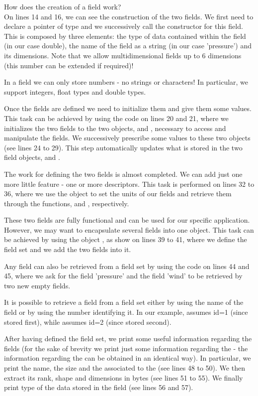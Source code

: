 How does the creation of a field work?\\
On lines 14 and 16, we can see the construction of the two fields.
We first need to declare a pointer of type  and we 
successively call the constructor for this field. This is composed 
by three elements: the type of data contained within the field 
(in our case double), the name of the field as a string (in our 
case 'pressure') and its dimensions.
Note that we allow multidimensional fields up to 6 dimensions 
(this number can be extended if required)!
%
\begin{tipbox}
In a field we can only store numbers - no strings or characters!
In particular, we support integers, float types and double types.
\end{tipbox}
%
Once the fields are defined we need to initialize them 
and give them some values. This task can be achieved 
by using the code on lines 20 and 21, where we initializes 
the two fields to the two  objects, 
and , necessary to access and manipulate the fields. 
We successively prescribe some values to these two objects 
(see lines 24 to 29). This step automatically updates what 
is stored in the two field objects,  
and .

The work for defining the two fields is almost completed.
We can add just one more little feature - one or more 
descriptors. This task is performed on lines 32 to 36, 
where we use the  object to set the 
units of our fields and retrieve them through the 
functions,  and , respectively.

These two fields are fully functional and can be used 
for our specific application. However, we may want to 
encapsulate several fields into one object. This task 
can be achieved by using the object , 
as show on lines 39 to 41, where we define the field 
set and we add the two fields into it.

Any field can also be retrieved from a field set by 
using the code on lines 44 and 45, where we ask for 
the field 'pressure' and the field 'wind' to be retrieved
by two new empty fields.
%
\begin{notebox}
It is possible to retrieve a field from a field set 
either by using the name of the field or by using 
the number identifying it. In our example,  
assumes id=1 (since stored first), while 
assumes id=2 (since stored second).
\end{notebox}
%
After having defined the field set, we print some 
useful information regarding the fields (for the 
sake of brevity we print just some information 
regarding the  - the information 
regarding the  can be obtained 
in an identical way).
In particular, we print the name, the size and the 
associated to the  (see lines 48 to 50).
We then extract its rank, shape and dimensions in bytes
(see lines 51 to 55). We finally print type of the data
stored in the field (see lines 56 and 57).

